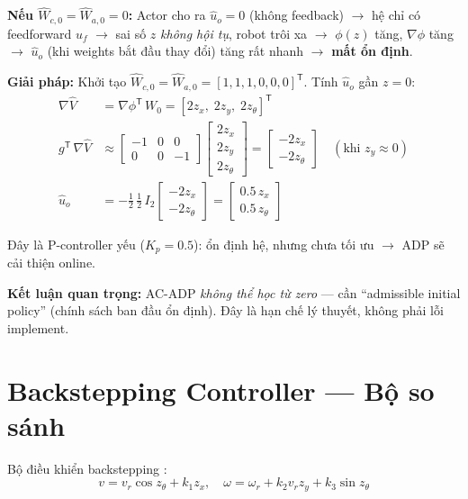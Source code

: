 \documentclass[12pt,a4paper]{article}
\newcommand{\T}{\mathsf{T}}
\begin{document}
\textbf{Nếu $\hat{W}_{c,0} = \hat{W}_{a,0} = 0$:} Actor cho ra $\hat{u}_o = 0$ (không feedback) $\to$ hệ chỉ có feedforward $u_f$ $\to$ sai số $z$ \textit{không hội tụ}, robot trôi xa $\to$ $\phi(z)$ tăng, $\nabla\phi$ tăng $\to$ $\hat{u}_o$ (khi weights bắt đầu thay đổi) tăng rất nhanh $\to$ \textbf{mất ổn định}.

\textbf{Giải pháp:} Khởi tạo $\hat{W}_{c,0} = \hat{W}_{a,0} = [1,1,1,0,0,0]^\T$. Tính $\hat{u}_o$ gần $z = 0$:
\begin{align}
    \nabla\hat{V} &= \nabla\phi^\T\, W_0 = [2z_x,\; 2z_y,\; 2z_\theta]^\T \\
    g^\T\, \nabla\hat{V} &\approx \begin{bmatrix} -1 & 0 & 0 \\ 0 & 0 & -1 \end{bmatrix} \begin{bmatrix} 2z_x \\ 2z_y \\ 2z_\theta \end{bmatrix} = \begin{bmatrix} -2z_x \\ -2z_\theta \end{bmatrix} \quad (\text{khi } z_y \approx 0) \\
    \hat{u}_o &= -\frac{1}{2}\, \frac{1}{2}\,I_2 \begin{bmatrix} -2z_x \\ -2z_\theta \end{bmatrix} = \begin{bmatrix} 0.5\, z_x \\ 0.5\, z_\theta \end{bmatrix}
\end{align}

Đây là P-controller yếu ($K_p = 0.5$): ổn định hệ, nhưng chưa tối ưu $\to$ ADP sẽ cải thiện online.

\textbf{Kết luận quan trọng:} AC-ADP \textit{không thể học từ zero} --- cần ``admissible initial policy'' (chính sách ban đầu ổn định). Đây là hạn chế lý thuyết, không phải lỗi implement.

\section{Backstepping Controller --- Bộ so sánh}

Bộ điều khiển backstepping \cite{Kanayama1990, Wang2025}:
\begin{equation}\label{eq:bc}
    v = v_r \cos z_\theta + k_1 z_x, \quad \omega = \omega_r + k_2 v_r z_y + k_3 \sin z_\theta
\end{equation}
\end{document}
